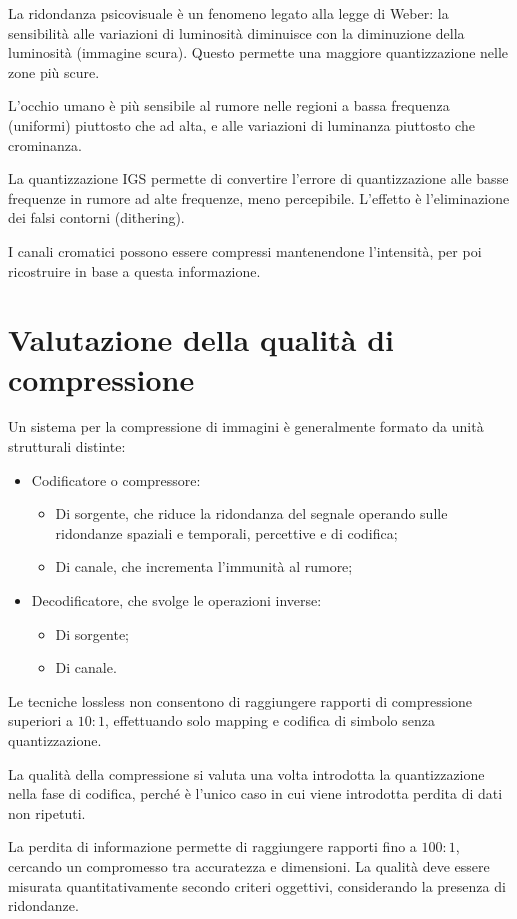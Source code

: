 La ridondanza psicovisuale è un fenomeno legato alla legge di Weber: la sensibilità alle variazioni di luminosità diminuisce con la diminuzione della luminosità (immagine scura). Questo permette una maggiore quantizzazione nelle zone più scure.

L'occhio umano è più sensibile al rumore nelle regioni a bassa frequenza (uniformi) piuttosto che ad alta, e alle variazioni di luminanza piuttosto che crominanza. 

La quantizzazione IGS permette di convertire l'errore di quantizzazione alle basse frequenze in rumore ad alte frequenze, meno percepibile. L'effetto è l'eliminazione dei falsi contorni (dithering). 

I canali cromatici possono essere compressi mantenendone l'intensità, per poi ricostruire in base a questa informazione. 

\section{Valutazione della qualità di compressione}
Un sistema per la compressione di immagini è generalmente formato da unità strutturali distinte:
\begin{itemize}
	\item Codificatore o compressore:
	\begin{itemize}
		\item Di sorgente, che riduce la ridondanza del segnale operando sulle ridondanze spaziali e temporali, percettive e di codifica;
		\item Di canale, che incrementa l'immunità al rumore;
	\end{itemize}
	\item Decodificatore, che svolge le operazioni inverse:
	\begin{itemize}
		\item Di sorgente;
		\item Di canale.
	\end{itemize}
\end{itemize}

Le tecniche lossless non consentono di raggiungere rapporti di compressione superiori a $10 : 1$, effettuando solo mapping e codifica di simbolo senza quantizzazione.

La qualità della compressione si valuta una volta introdotta la quantizzazione nella fase di codifica, perché è l'unico caso in cui viene introdotta perdita di dati non ripetuti. 

La perdita di informazione permette di raggiungere rapporti fino a $100 : 1$, cercando un compromesso tra accuratezza e dimensioni. La qualità deve essere misurata quantitativamente secondo criteri oggettivi, considerando la presenza di ridondanze. 

